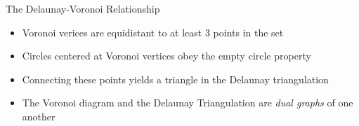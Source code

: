 \begin{frame}{The Delaunay-Voronoi Relationship}
	\begin{itemize}
		\item Voronoi verices are equidistant to at least 3 points in the set
		\item Circles centered at Voronoi vertices obey the empty circle property
		\item Connecting these points yields a triangle in the Delaunay triangulation
		\item The Voronoi diagram and the Delaunay Triangulation are \textit{dual graphs} of one another
	\end{itemize}
\end{frame}
